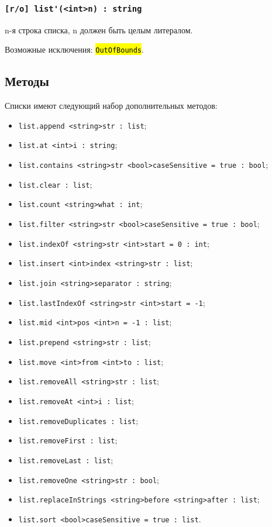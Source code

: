 \documentclass[a4paper, 14pt]{extarticle}
\newcommand{\ferror}[1]{{\fontsize{11pt}{12pt}\tt{\sethlcolor{yellow}\hl{#1}}}}
\newenvironment{icItems}
	{ \begin{itemize} [noitemsep,nolistsep] }
	{ \end{itemize} }
\begin{document}
\subsubsection{\lstinline|[r/o] list'(<int>n) : string|}

n-я строка списка, n должен быть целым литералом.

Возможные исключения: \ferror{OutOfBounds}.

\subsection{Методы}

Списки имеют следующий набор дополнительных методов:
\begin{icItems}
\item \lstinline|list.append <string>str : list|;
\item \lstinline|list.at <int>i : string|;
\item \lstinline|list.contains <string>str <bool>caseSensitive = true : bool|;
\item \lstinline|list.clear : list|;
\item \lstinline|list.count <string>what : int|;
\item \lstinline|list.filter <string>str <bool>caseSensitive = true : bool|;
\item \lstinline|list.indexOf <string>str <int>start = 0 : int|;
\item \lstinline|list.insert <int>index <string>str : list|;
\item \lstinline|list.join <string>separator : string|;
\item \lstinline|list.lastIndexOf <string>str <int>start = -1|;
\item \lstinline|list.mid <int>pos <int>n = -1 : list|;
\item \lstinline|list.prepend <string>str : list|;
\item \lstinline|list.move <int>from <int>to : list|;
\item \lstinline|list.removeAll <string>str : list|;
\item \lstinline|list.removeAt <int>i : list|;
\item \lstinline|list.removeDuplicates : list|;
\item \lstinline|list.removeFirst : list|;
\item \lstinline|list.removeLast : list|;
\item \lstinline|list.removeOne <string>str : bool|;
\item \lstinline|list.replaceInStrings <string>before <string>after : list|;
\item \lstinline|list.sort <bool>caseSensitive = true : list|.
\end{icItems}
\end{document}
